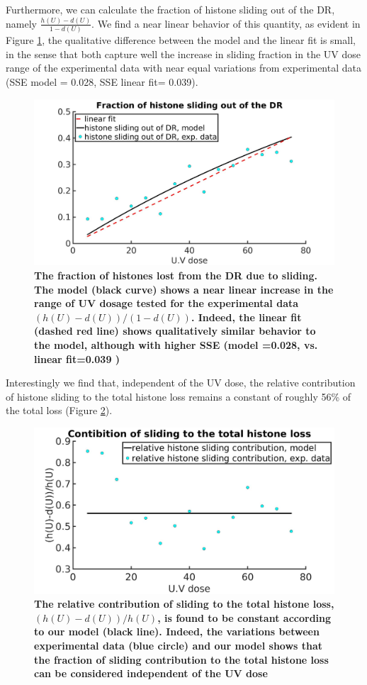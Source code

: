 \documentclass[12pt]{article}
\begin{document}
Furthermore, we can calculate the fraction of histone sliding out of the DR, namely $\frac{h(U)-d(U)}{1-d(U)}$. We find a near linear behavior of this quantity, as evident
in Figure \ref{fig:histoneSlideFromDamageRegionComparision}, the qualitative difference between the model and the linear fit is small, in the sense that both capture well the increase in sliding fraction in the UV dose range of the experimental data with near equal variations from experimental data (SSE model = 0.028, SSE linear fit= 0.039).

\begin{figure}[H]
	\centering
	\includegraphics[width=0.7\linewidth, height=0.3\textheight]{histoneSlideFromDamageRegionComparision}
	\caption{\textbf{The fraction of histones lost from the DR due to sliding. The model (black curve) shows a near linear increase in the range of UV dosage tested for the experimental data $(h(U)-d(U))/(1-d(U))$. Indeed, the linear fit (dashed red line) shows qualitatively similar behavior to the model, although with higher SSE (model =0.028, vs. linear fit=0.039 ) }}
	\label{fig:histoneSlideFromDamageRegionComparision}
\end{figure}

Interestingly we find that, independent of the UV dose, the relative contribution of histone sliding to the total histone loss remains a constant of roughly 56\% of the total loss (Figure \ref{fig:relativeSlidingContribution}). 

\begin{figure}[H]
\centering
\includegraphics[width=0.5\linewidth, height=0.3\textheight]{relativeSlidingContribution}
\caption{\textbf{The relative contribution of sliding to the total histone loss, $(h(U)-d(U))/h(U)$, is found to be constant according to our model (black line). Indeed, the variations between experimental data (blue circle) and our model shows that the fraction of sliding contribution to the total histone loss can be considered independent of the UV dose}}
\label{fig:relativeSlidingContribution}
\end{figure}
\end{document}

